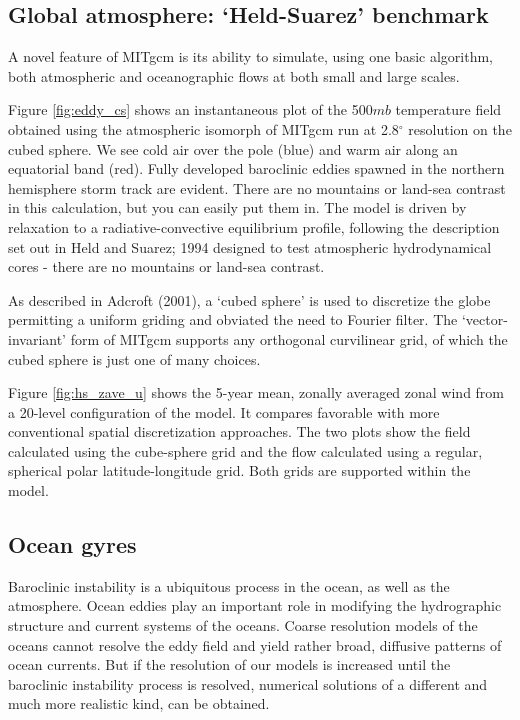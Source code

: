 \subsection{Global atmosphere: `Held-Suarez' benchmark}

A novel feature of MITgcm is its ability to simulate, using one basic algorithm, 
both atmospheric and oceanographic flows at both small and large scales.

Figure \ref{fig:eddy_cs} shows an instantaneous plot of the 500$mb$
temperature field obtained using the atmospheric isomorph of MITgcm run at
2.8$^{\circ }$ resolution on the cubed sphere. We see cold air over the pole
(blue) and warm air along an equatorial band (red). Fully developed
baroclinic eddies spawned in the northern hemisphere storm track are
evident. There are no mountains or land-sea contrast in this calculation,
but you can easily put them in. The model is driven by relaxation to a
radiative-convective equilibrium profile, following the description set out
in Held and Suarez; 1994 designed to test atmospheric hydrodynamical cores -
there are no mountains or land-sea contrast.



As described in Adcroft (2001), a `cubed sphere' is used to discretize the
globe permitting a uniform griding and obviated the need to Fourier filter.
The `vector-invariant' form of MITgcm supports any orthogonal curvilinear
grid, of which the cubed sphere is just one of many choices.

Figure \ref{fig:hs_zave_u} shows the 5-year mean, zonally averaged zonal
wind from a 20-level configuration of
the model. It compares favorable with more conventional spatial
discretization approaches. The two plots show the field calculated using the
cube-sphere grid and the flow calculated using a regular, spherical polar
latitude-longitude grid. Both grids are supported within the model.



\subsection{Ocean gyres}

Baroclinic instability is a ubiquitous process in the ocean, as well as the
atmosphere. Ocean eddies play an important role in modifying the
hydrographic structure and current systems of the oceans. Coarse resolution
models of the oceans cannot resolve the eddy field and yield rather broad,
diffusive patterns of ocean currents. But if the resolution of our models is
increased until the baroclinic instability process is resolved, numerical
solutions of a different and much more realistic kind, can be obtained.

